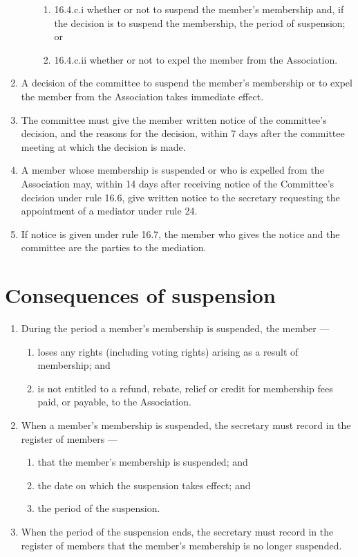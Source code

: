 \begin{enumerate}
\begin{enumerate}
\begin{enumerate}
    \item 16.4.c.i whether or not to suspend the member's membership and, if the decision is to suspend the membership, the period of suspension; or
    \item 16.4.c.ii whether or not to expel the member from the Association.
    \end{enumerate}
  \end{enumerate}
\item A decision of the committee to suspend the member's membership or to expel the member from the Association takes immediate effect.
\item The committee must give the member written notice of the committee's decision, and the reasons for the decision, within 7 days after the committee meeting at which the decision is made.
\item A member whose membership is suspended or who is expelled from the Association may, within 14 days after receiving notice of the Committee's decision under rule 16.6, give written notice to the secretary requesting the appointment of a mediator under rule 24.
\item If notice is given under rule 16.7, the member who gives the notice and the committee are the parties to the mediation.
\end{enumerate}

\hypertarget{consequences-of-suspension}{%
\section{Consequences of suspension}\label{consequences-of-suspension}}

\begin{enumerate}

\item During the period a member's membership is suspended, the member ---

  \begin{enumerate}
  
  \item loses any rights (including voting rights) arising as a result of membership; and
  \item is not entitled to a refund, rebate, relief or credit for membership fees paid, or payable, to the Association.
  \end{enumerate}
\item When a member's membership is suspended, the secretary must record in the register of members ---

  \begin{enumerate}
  
  \item that the member's membership is suspended; and
  \item the date on which the suspension takes effect; and
  \item the period of the suspension.
  \end{enumerate}
\item When the period of the suspension ends, the secretary must record in the register of members that the member's membership is no longer suspended.
\end{enumerate}

